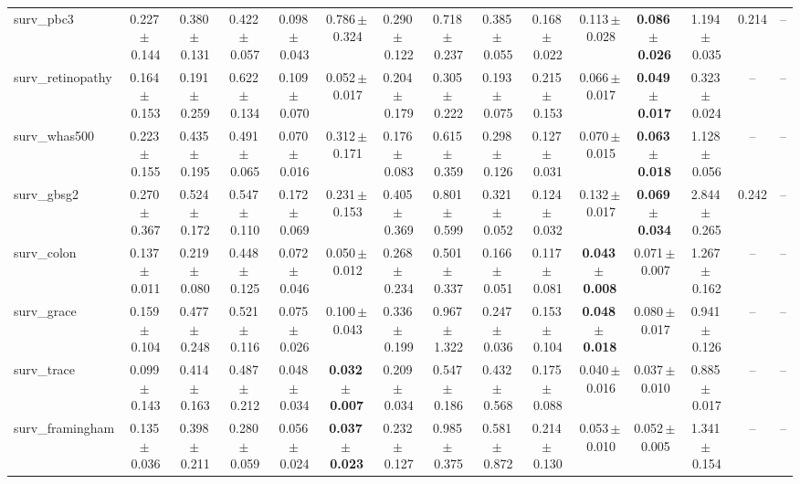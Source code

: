 \documentclass[8pt]{extarticle}
\begin{document}
\begin{longtable}{l*{14}{c}}
surv\_pbc3 & 0.227\,$\pm$\,0.144 & 0.380\,$\pm$\,0.131 & 0.422\,$\pm$\,0.057 & 0.098\,$\pm$\,0.043 & 0.786\,$\pm$\,0.324 & 0.290\,$\pm$\,0.122 & 0.718\,$\pm$\,0.237 & 0.385\,$\pm$\,0.055 & 0.168\,$\pm$\,0.022 & 0.113\,$\pm$\,0.028 & \textbf{0.086\,$\pm$\,0.026} & 1.194\,$\pm$\,0.035 & 0.214 & -- \\
surv\_retinopathy & 0.164\,$\pm$\,0.153 & 0.191\,$\pm$\,0.259 & 0.622\,$\pm$\,0.134 & 0.109\,$\pm$\,0.070 & 0.052\,$\pm$\,0.017 & 0.204\,$\pm$\,0.179 & 0.305\,$\pm$\,0.222 & 0.193\,$\pm$\,0.075 & 0.215\,$\pm$\,0.153 & 0.066\,$\pm$\,0.017 & \textbf{0.049\,$\pm$\,0.017} & 0.323\,$\pm$\,0.024 & -- & -- \\
surv\_whas500 & 0.223\,$\pm$\,0.155 & 0.435\,$\pm$\,0.195 & 0.491\,$\pm$\,0.065 & 0.070\,$\pm$\,0.016 & 0.312\,$\pm$\,0.171 & 0.176\,$\pm$\,0.083 & 0.615\,$\pm$\,0.359 & 0.298\,$\pm$\,0.126 & 0.127\,$\pm$\,0.031 & 0.070\,$\pm$\,0.015 & \textbf{0.063\,$\pm$\,0.018} & 1.128\,$\pm$\,0.056 & -- & -- \\
surv\_gbsg2 & 0.270\,$\pm$\,0.367 & 0.524\,$\pm$\,0.172 & 0.547\,$\pm$\,0.110 & 0.172\,$\pm$\,0.069 & 0.231\,$\pm$\,0.153 & 0.405\,$\pm$\,0.369 & 0.801\,$\pm$\,0.599 & 0.321\,$\pm$\,0.052 & 0.124\,$\pm$\,0.032 & 0.132\,$\pm$\,0.017 & \textbf{0.069\,$\pm$\,0.034} & 2.844\,$\pm$\,0.265 & 0.242 & -- \\
surv\_colon & 0.137\,$\pm$\,0.011 & 0.219\,$\pm$\,0.080 & 0.448\,$\pm$\,0.125 & 0.072\,$\pm$\,0.046 & 0.050\,$\pm$\,0.012 & 0.268\,$\pm$\,0.234 & 0.501\,$\pm$\,0.337 & 0.166\,$\pm$\,0.051 & 0.117\,$\pm$\,0.081 & \textbf{0.043\,$\pm$\,0.008} & 0.071\,$\pm$\,0.007 & 1.267\,$\pm$\,0.162 & -- & -- \\
surv\_grace & 0.159\,$\pm$\,0.104 & 0.477\,$\pm$\,0.248 & 0.521\,$\pm$\,0.116 & 0.075\,$\pm$\,0.026 & 0.100\,$\pm$\,0.043 & 0.336\,$\pm$\,0.199 & 0.967\,$\pm$\,1.322 & 0.247\,$\pm$\,0.036 & 0.153\,$\pm$\,0.104 & \textbf{0.048\,$\pm$\,0.018} & 0.080\,$\pm$\,0.017 & 0.941\,$\pm$\,0.126 & -- & -- \\
surv\_trace & 0.099\,$\pm$\,0.143 & 0.414\,$\pm$\,0.163 & 0.487\,$\pm$\,0.212 & 0.048\,$\pm$\,0.034 & \textbf{0.032\,$\pm$\,0.007} & 0.209\,$\pm$\,0.034 & 0.547\,$\pm$\,0.186 & 0.432\,$\pm$\,0.568 & 0.175\,$\pm$\,0.088 & 0.040\,$\pm$\,0.016 & 0.037\,$\pm$\,0.010 & 0.885\,$\pm$\,0.017 & -- & -- \\
surv\_framingham & 0.135\,$\pm$\,0.036 & 0.398\,$\pm$\,0.211 & 0.280\,$\pm$\,0.059 & 0.056\,$\pm$\,0.024 & \textbf{0.037\,$\pm$\,0.023} & 0.232\,$\pm$\,0.127 & 0.985\,$\pm$\,0.375 & 0.581\,$\pm$\,0.872 & 0.214\,$\pm$\,0.130 & 0.053\,$\pm$\,0.010 & 0.052\,$\pm$\,0.005 & 1.341\,$\pm$\,0.154 & -- & -- \\

\end{longtable}
\end{document}
